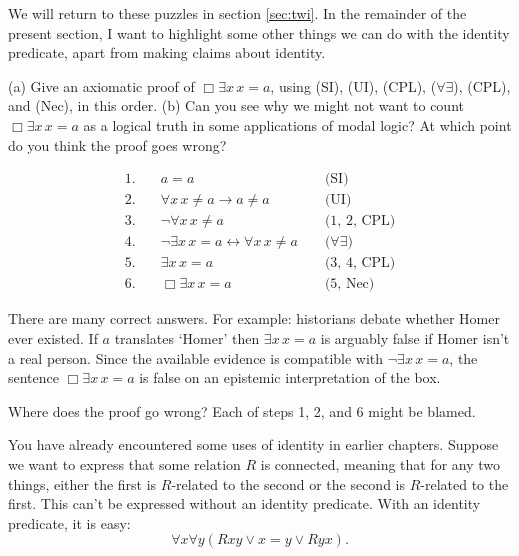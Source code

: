 We will return to these puzzles in section \ref{sec:twi}. In the remainder of the
present section, I want to highlight some other things we can do with the
identity predicate, apart from making claims about identity.

\begin{exercise}
  (a) Give an axiomatic proof of $\Box \exists x\, x=a$, using (SI), (UI), (CPL),
  ($\forall\exists$), (CPL), and (Nec), in this order. (b) Can you see why we might
  not want to count $\Box\exists x\, x=a$ as a logical truth in some
  applications of modal logic? At which point do you think the proof goes wrong?
\end{exercise}
\begin{solution}
  \begin{sollist}
    
    \item 
\begin{align*}
   1. \quad & a=a &&\text{ (SI)}\\
   2. \quad & \forall x\, x\not= a \to a\not= a &&\text{ (UI)}\\
   3. \quad & \neg \forall x\, x\not=a &&\text{ (1, 2, CPL)}\\
   4. \quad & \neg \exists x\, x=a \leftrightarrow \forall x \, x\not=a &&\text{ ($\forall\exists$)}\\
   5. \quad & \exists x\, x=a &&\text{ (3, 4, CPL)}\\
   6. \quad & \Box\exists x\, x=a &&\text{ (5, Nec)}
\end{align*}

\item There are many correct answers. For example: historians debate whether
Homer ever existed. If $a$ translates `Homer' then $\exists x\, x=a$ is arguably false if Homer isn't a real person. Since the available evidence is compatible with  $\neg \exists x\, x=a$, the sentence $\Box\exists x\, x=a$ is false on an epistemic interpretation of the box.

Where does the proof go wrong? Each of steps 1, 2, and 6 might be blamed.
\end{sollist}
\end{solution}

You have already encountered some uses of identity in earlier chapters. Suppose we want
to express that some relation $R$ is connected, meaning that for any two things,
either the first is $R$-related to the second or the second is $R$-related to
the first. This can't be expressed without an identity predicate. With an
identity predicate, it is easy:
\[
  \forall x\forall y(Rxy \lor x\!=\!y \lor Ryx).
\]

